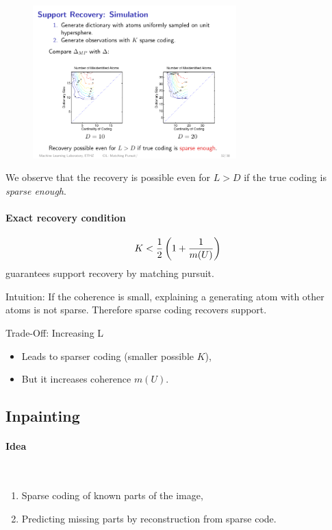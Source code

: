 \begin{figure}[H]
    \centering
    \includegraphics[width=0.7\textwidth]{img/09_mp_recovery}
\end{figure}
We observe that the recovery is possible even for $L>D$ if the true coding is \emph{sparse enough}.

\paragraph{Exact recovery condition}
    \begin{align*}
     K < {1\over 2} \left( 1+{1\over m(U)}\right)
    \end{align*}
guarantees support recovery by matching pursuit.


\begin{description}
\item Intuition: If the coherence is small, explaining a generating atom with other atoms is not sparse. Therefore sparse coding recovers support.
\item Trade-Off: Increasing L
    \begin{itemize}
        \item Leads to sparser coding (smaller possible $K$),
        \item But it increases coherence $m(U)$.
    \end{itemize}
\end{description}

\subsection{Inpainting}
\paragraph{Idea} $\ $
\begin{enumerate}
\item Sparse coding of known parts of the image,
\item Predicting missing parts by reconstruction from sparse code.
\end{enumerate}
